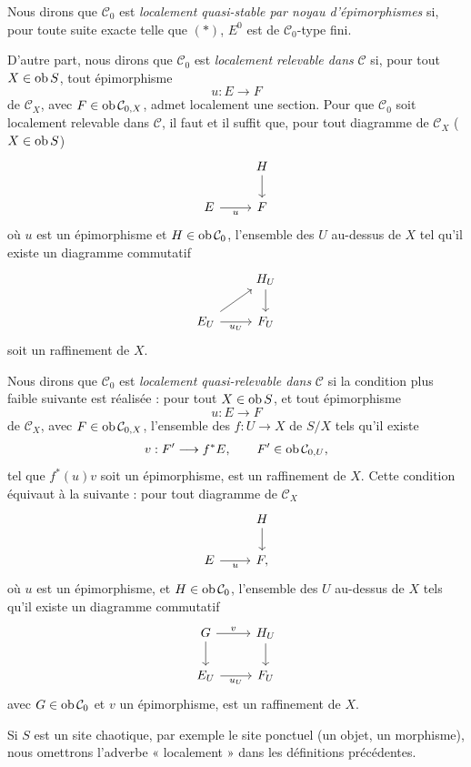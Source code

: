 \documentclass[11pt]{article}
\begin{document}
Nous dirons que \(\mathcal C_0\) est \emph{localement quasi-stable par noyau d'épimorphismes} si, pour toute suite exacte telle que \((*)\), \(E^0\) est de \(\mathcal C_0\)-type fini.

D'autre part, nous dirons que \(\mathcal C_0\) est \emph{localement relevable dans} \(\mathcal C\) si, pour tout \(X\in\operatorname{ob} S\), tout épimorphisme
\[
  u:E\longrightarrow F
\]
de \(\mathcal C_X\), avec \(F\in\operatorname{ob}\mathcal C_{0,X}\), admet localement une section. Pour que \(\mathcal C_0\) soit localement relevable dans \(\mathcal C\), il faut et il suffit que, pour tout diagramme de \(\mathcal C_X\) (\(X\in\operatorname{ob} S\))
\[
\begin{tikzcd}
& H \arrow[d]\\
E \arrow[r,"u"'] & F
\end{tikzcd}
\]
où \(u\) est un épimorphisme et \(H\in\operatorname{ob}\mathcal C_0\), l'ensemble des \(U\) au-dessus de \(X\) tel qu'il existe un diagramme commutatif
\[
\begin{tikzcd}
& H_U \arrow[d]\\
E_U \arrow[r,"u_U"'] \arrow[ur] & F_U
\end{tikzcd}
\]
soit un raffinement de \(X\).

Nous dirons que \(\mathcal C_0\) est \emph{localement quasi-relevable dans} \(\mathcal C\) si la condition plus faible suivante est réalisée : pour tout \(X\in\operatorname{ob} S\), et tout épimorphisme
\[
  u:E\longrightarrow F
\]
de \(\mathcal C_X\), avec \(F\in\operatorname{ob}\mathcal C_{0,X}\), l'ensemble des \(f:U\to X\) de \(S/X\) tels qu'il existe
\[
  v:F'\longrightarrow f^*E,\qquad F'\in\operatorname{ob}\mathcal C_{0,U},
\]
tel que \(f^*(u)v\) soit un épimorphisme, est un raffinement de \(X\). Cette condition équivaut à la suivante : pour tout diagramme de \(\mathcal C_X\)
\[
\begin{tikzcd}
& H \arrow[d]\\
E \arrow[r,"u"'] & F ,
\end{tikzcd}
\]
où \(u\) est un épimorphisme, et \(H\in\operatorname{ob}\mathcal C_0\), l'ensemble des \(U\) au-dessus de \(X\) tels qu'il existe un diagramme commutatif
\[
\begin{tikzcd}
G \arrow[r,"v"] \arrow[d] & H_U \arrow[d]\\
E_U \arrow[r,"u_U"'] & F_U
\end{tikzcd}
\]
avec \(G\in\operatorname{ob}\mathcal C_0\) et \(v\) un épimorphisme, est un raffinement de \(X\).

Si \(S\) est un site chaotique, par exemple le site ponctuel (un objet, un morphisme), nous omettrons l'adverbe « localement » dans les définitions précédentes.
\end{document}

